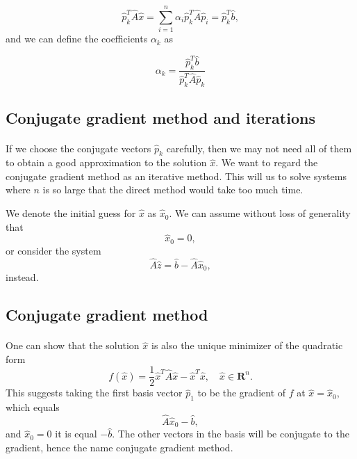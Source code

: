 \documentclass[%
oneside,                 %
final,                   %
10pt]{article}
\begin{document}
\begin{equation*}
  \hat{p}_k^T \hat{A}\hat{x} = \sum^{n}_{i=1} \alpha_i\hat{p}_k^T \hat{A}\hat{p}_i= \hat{p}_k^T \hat{b},
\end{equation*}
and we can define the coefficients $\alpha_k$ as

\begin{equation*}
    \alpha_k = \frac{\hat{p}_k^T \hat{b}}{\hat{p}_k^T \hat{A} \hat{p}_k}
\end{equation*}



\subsection*{Conjugate gradient method and iterations}

\paragraph{}

If we choose the conjugate vectors $\hat{p}_k$ carefully, 
then we may not need all of them to obtain a good approximation to the solution 
$\hat{x}$. 
We want to regard the conjugate gradient method as an iterative method. 
This will us to solve systems where $n$ is so large that the direct 
method would take too much time.

We denote the initial guess for $\hat{x}$ as $\hat{x}_0$. 
We can assume without loss of generality that
\begin{equation*}
\hat{x}_0=0,
\end{equation*}
or consider the system
\begin{equation*}
\hat{A}\hat{z} = \hat{b}-\hat{A}\hat{x}_0,
\end{equation*}
instead.



\subsection*{Conjugate gradient method}

\paragraph{}
One can show that the solution $\hat{x}$ is also the unique minimizer of the quadratic form
\begin{equation*}
  f(\hat{x}) = \frac{1}{2}\hat{x}^T\hat{A}\hat{x} - \hat{x}^T \hat{x} , \quad \hat{x}\in\mathbf{R}^n. 
\end{equation*}
This suggests taking the first basis vector $\hat{p}_1$ 
to be the gradient of $f$ at $\hat{x}=\hat{x}_0$, 
which equals
\begin{equation*}
\hat{A}\hat{x}_0-\hat{b},
\end{equation*}
and 
$\hat{x}_0=0$ it is equal $-\hat{b}$.
The other vectors in the basis will be conjugate to the gradient, 
hence the name conjugate gradient method.
\end{document}
